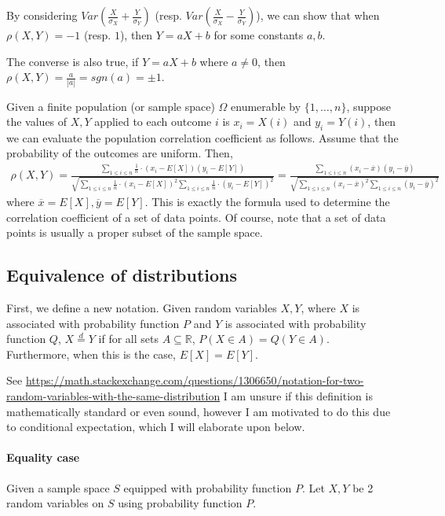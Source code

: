 \documentclass{article}
\newcommand{\eqdis}[0]{\stackrel{d}{=}}
\begin{document}
By considering $Var\left(\frac{X}{\sigma_X} + \frac{Y}{\sigma_Y}\right)$ (resp. $Var\left(\frac{X}{\sigma_X} - \frac{Y}{\sigma_Y}\right)$), we can show that when $\rho(X,Y) = -1$ (resp. $1$), then $Y = aX + b$ for some constants $a,b$.

The converse is also true, if $Y=aX+b$ where $a\neq 0$, then $\rho(X,Y) = \frac{a}{|a|} = sgn(a) = \pm 1$.

Given a finite population (or sample space) $\Omega$ enumerable by $\{1,\dots,n\}$, suppose the values of $X,Y$ applied to each outcome $i$ is $x_i = X(i)$ and $y_i = Y(i)$, then we can evaluate the population correlation coefficient as follows. Assume that the probability of the outcomes are uniform. Then,
\begin{align*}
	\rho(X,Y) = \frac{\sum_{1\leq i\leq n}\frac{1}{n}\cdot(x_i-E[X])(y_i-E[Y])}{\sqrt{\sum_{1\leq i\leq n}\frac{1}{n}\cdot (x_i-E[X])^2\sum_{1\leq i\leq n}\frac{1}{n}\cdot (y_i-E[Y])^2}} = \frac{\sum_{1\leq i\leq n}(x_i-\overline{x})(y_i-\overline{y})}{\sqrt{\sum_{1\leq i\leq n}(x_i-\overline{x})^2\sum_{1\leq i\leq n}(y_i-\overline{y})^2}}
\end{align*}
where $\overline{x} = E[X], \overline{y} = E[Y]$. This is exactly the formula used to determine the correlation coefficient of a set of data points. Of course, note that a set of data points is usually a proper subset of the sample space.

\subsection{Equivalence of distributions}
First, we define a new notation. Given random variables $X,Y$, where $X$ is associated with probability function $P$ and $Y$ is associated with probability function $Q$, $X\eqdis Y$ if for all sets $A\subseteq \mathbb{R}$, $P(X\in A) = Q(Y\in A)$.\\
Furthermore, when this is the case, $E[X] = E[Y]$.

See \url{https://math.stackexchange.com/questions/1306650/notation-for-two-random-variables-with-the-same-distribution}
I am unsure if this definition is mathematically standard or even sound, however I am motivated to do this due to conditional expectation, which I will elaborate upon below.

\paragraph{Equality case} Given a sample space $S$ equipped with probability function $P$. Let $X,Y$ be 2 random variables on $S$ using probability function $P$.
\end{document}
